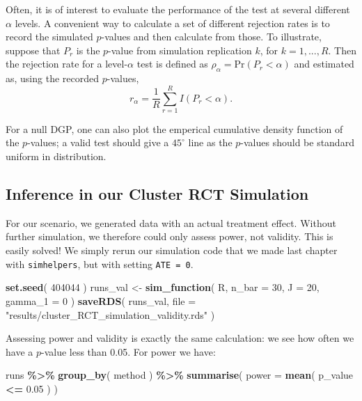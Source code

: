\documentclass[
]{book}
\newenvironment{Shaded}{\begin{snugshade}}{\end{snugshade}}
\newcommand{\AttributeTok}[1]{\textcolor[rgb]{0.13,0.29,0.53}{#1}}
\newcommand{\DecValTok}[1]{\textcolor[rgb]{0.00,0.00,0.81}{#1}}
\newcommand{\FloatTok}[1]{\textcolor[rgb]{0.00,0.00,0.81}{#1}}
\newcommand{\FunctionTok}[1]{\textcolor[rgb]{0.13,0.29,0.53}{\textbf{#1}}}
\newcommand{\NormalTok}[1]{#1}
\newcommand{\OtherTok}[1]{\textcolor[rgb]{0.56,0.35,0.01}{#1}}
\newcommand{\SpecialCharTok}[1]{\textcolor[rgb]{0.81,0.36,0.00}{\textbf{#1}}}
\newcommand{\StringTok}[1]{\textcolor[rgb]{0.31,0.60,0.02}{#1}}
\begin{document}
Often, it is of interest to evaluate the performance of the test at several different \(\alpha\) levels.
A convenient way to calculate a set of different rejection rates is to record the simulated \(p\)-values and then calculate from those.
To illustrate, suppose that \(P_r\) is the \(p\)-value from simulation replication \(k\), for \(k = 1,...,R\).
Then the rejection rate for a level-\(\alpha\) test is defined as \(\rho_\alpha = \text{Pr}\left(P_r < \alpha\right)\) and estimated as, using the recorded \(p\)-values,
\[r_\alpha = \frac{1}{R} \sum_{r=1}^R I(P_r < \alpha).\]

For a null DGP, one can also plot the emperical cumulative density function of the \(p\)-values; a valid test should give a \(45^\circ\) line as the \(p\)-values should be standard uniform in distribution.

\subsection{Inference in our Cluster RCT Simulation}\label{inference-in-our-cluster-rct-simulation}

For our scenario, we generated data with an actual treatment effect.
Without further simulation, we therefore could only assess power, not validity.
This is easily solved!
We simply rerun our simulation code that we made last chapter with \texttt{simhelpers}, but with setting \texttt{ATE\ =\ 0}.

\begin{Shaded}
\begin{Highlighting}[]
\FunctionTok{set.seed}\NormalTok{( }\DecValTok{404044}\NormalTok{ )}
\NormalTok{runs\_val }\OtherTok{\textless{}{-}} \FunctionTok{sim\_function}\NormalTok{( R, }\AttributeTok{n\_bar =} \DecValTok{30}\NormalTok{, }\AttributeTok{J =} \DecValTok{20}\NormalTok{, }\AttributeTok{gamma\_1 =} \DecValTok{0}\NormalTok{ )}
\FunctionTok{saveRDS}\NormalTok{( runs\_val, }\AttributeTok{file =} \StringTok{"results/cluster\_RCT\_simulation\_validity.rds"}\NormalTok{ )}
\end{Highlighting}
\end{Shaded}

Assessing power and validity is exactly the same calculation: we see how often we have a \(p\)-value less than 0.05.
For power we have:

\begin{Shaded}
\begin{Highlighting}[]
\NormalTok{runs }\SpecialCharTok{\%\textgreater{}\%} \FunctionTok{group\_by}\NormalTok{( method ) }\SpecialCharTok{\%\textgreater{}\%}
  \FunctionTok{summarise}\NormalTok{( }\AttributeTok{power =} \FunctionTok{mean}\NormalTok{( p\_value }\SpecialCharTok{\textless{}=} \FloatTok{0.05}\NormalTok{ ) )}
\end{Highlighting}
\end{Shaded}
\end{document}
